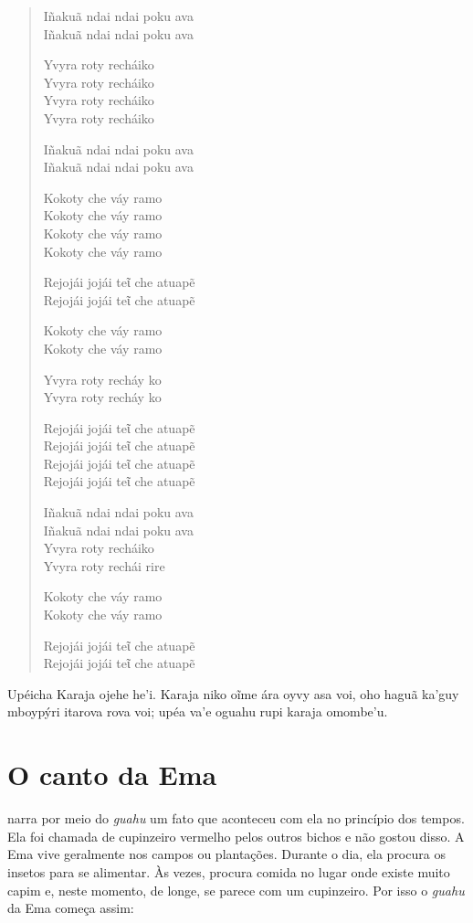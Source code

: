 \begin{verse}
Iñakuã ndai ndai poku ava\\
Iñakuã ndai ndai poku ava

Yvyra roty recháiko\\
Yvyra roty recháiko\\
Yvyra roty recháiko\\
Yvyra roty recháiko

Iñakuã ndai ndai poku ava\\
Iñakuã ndai ndai poku ava

Kokoty che váy ramo\\
Kokoty che váy ramo\\
Kokoty che váy ramo\\
Kokoty che váy ramo

Rejojái jojái teῖ che atuapẽ\\
Rejojái jojái teῖ che atuapẽ

\pagebreak
Kokoty che váy ramo\\
Kokoty che váy ramo

Yvyra roty recháy ko\\
Yvyra roty recháy ko

Rejojái jojái teῖ che atuapẽ\\
Rejojái jojái teῖ che atuapẽ\\
Rejojái jojái teῖ che atuapẽ\\
Rejojái jojái teῖ che atuapẽ

Iñakuã ndai ndai poku ava\\
Iñakuã ndai ndai poku ava\\
Yvyra roty recháiko\\
Yvyra roty rechái rire

Kokoty che váy ramo\\
Kokoty che váy ramo

Rejojái jojái teῖ che atuapẽ\\
Rejojái jojái teῖ che atuapẽ
\end{verse}

Upéicha Karaja ojehe he'i. Karaja niko oĩme ára oyvy asa voi, oho haguã
ka'guy mboypýri itarova rova voi; upéa va'e oguahu rupi karaja omombe'u.

\chapter{O canto da Ema}

 narra por meio do \textit{guahu} um fato que aconteceu com ela no
princípio dos tempos. Ela foi chamada de cupinzeiro vermelho pelos
outros bichos e não gostou disso. A Ema vive geralmente nos campos ou
plantações. Durante o dia, ela procura os insetos para se alimentar. Às
vezes, procura comida no lugar onde existe muito capim e, neste momento,
de longe, se parece com um cupinzeiro. Por isso o \textit{guahu} da Ema
começa assim:

